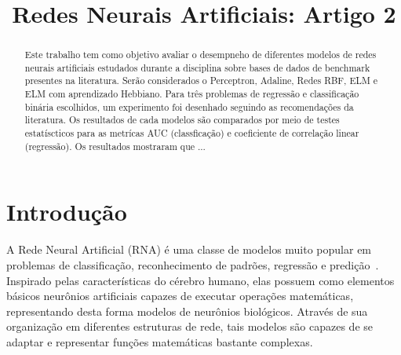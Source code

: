 \documentclass[conference]{IEEEtran}
\begin{document}
	
	\title{Redes Neurais Artificiais: Artigo 2}
	
	
	\author{
		}
	
	
	
	\maketitle
	
	\begin{abstract}
		Este trabalho tem como objetivo avaliar o desempneho de diferentes modelos de redes neurais artificiais estudados durante a disciplina sobre bases de dados de benchmark presentes na literatura. Serão considerados o Perceptron, Adaline, Redes RBF, ELM e ELM com aprendizado Hebbiano. Para três problemas de regressão e classificação binária escolhidos, um experimento foi desenhado seguindo as recomendações da literatura. Os resultados de cada modelos são comparados por meio de testes estatíscticos para as metrícas AUC (classficação) e coeficiente de correlação linear (regressão). Os resultados mostraram que ...
	\end{abstract}

	\section{Introdução}
	A Rede Neural Artificial (RNA) é uma classe de modelos muito popular em problemas de classificação, reconhecimento de padrões, regressão e predição~\cite{jain1996artificial}. Inspirado pelas características do cérebro humano, elas possuem como elementos básicos neurônios artificiais capazes de executar operações matemáticas, representando desta forma modelos de neurônios biológicos. Através de sua organização em diferentes estruturas de rede, tais modelos são capazes de se adaptar e representar funções matemáticas bastante complexas. 
\end{document}
